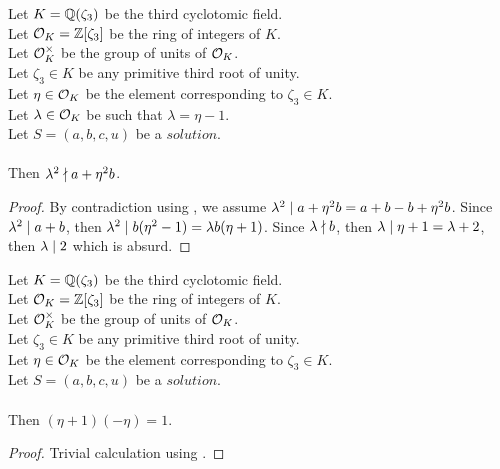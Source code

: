 \begin{lemma}
    \label{lmm:lambda_sq_not_dvd_a_add_eta_sq_mul_b}
    \leanok
    Let $K = \mathbb{Q}(\zeta_3)$ be the third cyclotomic field. \\
    Let $\mathcal{O}_K = \mathbb{Z}[\zeta_3]$ be the ring of integers of $K$. \\
    Let $\mathcal{O}^\times_K$ be the group of units of $\mathcal{O}_K$. \\
    Let $\zeta_3 \in K$ be any primitive third root of unity. \\
    Let $\eta \in \mathcal{O}_K$ be the element corresponding to $\zeta_3 \in K$. \\
    Let $\lambda \in \mathcal{O}_K$ be such that $\lambda = \eta -1$. \\
    Let $S=(a, b, c, u)$ be a $solution$.\\\\
    Then $\lambda^2 \nmid a + \eta^2  b$.
\end{lemma}
\begin{proof}
    \leanok
    By contradiction using , we assume
    $\lambda^2 \mid a +\eta^2 b = a + b -b + \eta^2  b$.
    Since $\lambda^2 \mid a+b$, then $\lambda^2 \mid b (\eta^2 -1)
    = \lambda b (\eta + 1)$. Since $\lambda \nmid b$, then
    $\lambda \mid \eta+1 = \lambda +2$, then $\lambda \mid 2$ which is absurd.
\end{proof}

\begin{lemma}
    \label{lmm:eta_add_one_inv}
    \leanok
    Let $K = \mathbb{Q}(\zeta_3)$ be the third cyclotomic field. \\
    Let $\mathcal{O}_K = \mathbb{Z}[\zeta_3]$ be the ring of integers of $K$. \\
    Let $\mathcal{O}^\times_K$ be the group of units of $\mathcal{O}_K$. \\
    Let $\zeta_3 \in K$ be any primitive third root of unity. \\
    Let $\eta \in \mathcal{O}_K$ be the element corresponding to $\zeta_3 \in K$. \\
    Let $S=(a, b, c, u)$ be a $solution$.\\\\
    Then $(\eta + 1)  (-\eta) = 1$.
\end{lemma}
\begin{proof}
    \leanok
    Trivial calculation using .
\end{proof}

